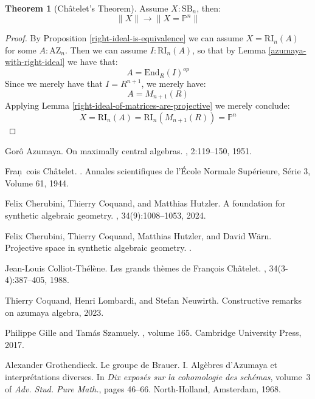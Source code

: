 \documentclass[10pt,a4paper]{article}
\theoremstyle{definition}
\newtheorem{theorem}{Theorem}[section]
\newcommand{\SB}{\mathrm{SB}}
\newcommand{\RI}{\mathrm{RI}}
\newcommand{\AZ}{\mathrm{AZ}}
\newcommand{\propTrunc}[1]{\lVert #1 \rVert}
\newcommand{\bP}{\mathbb{P}}
\begin{document}
\begin{theorem}[Ch\^atelet's Theorem]\label{chatelet-theorem}
Assume $X:\SB_n$, then:
\[\propTrunc{X}\to\propTrunc{X=\bP^n}\]
\end{theorem}

\begin{proof}
By Proposition \ref{right-ideal-is-equivalence} we can assume $X=\RI_n(A)$ for some $A:\AZ_n$. Then we can assume $I:\RI_n(A)$, so that by Lemma \ref{azumaya-with-right-ideal} we have that:
\[A=\mathrm{End}_R(I)^{op}\]
Since we merely have that $I=R^{n+1}$, we merely have:
\[A = M_{n+1}(R)\]
Applying Lemma \ref{right-ideal-of-matrices-are-projective} we merely conclude:
\[X=\RI_n(A)=\RI_n(M_{n+1}(R)) = \bP^n\]
\end{proof}

\begin{thebibliography}{10}

Gor\^o Azumaya.
\newblock On maximally central algebras.
, 2:119--150, 1951.

Fran\c~cois Ch\^atelet.
.
\newblock Annales scientifiques de l'\'Ecole Normale Sup\'erieure, S\'erie 3,
  Volume 61, 1944.

Felix {Cherubini}, Thierry {Coquand}, and Matthias {Hutzler}.
\newblock A foundation for synthetic algebraic geometry.
, 34(9):1008--1053,
  2024.

Felix Cherubini, Thierry Coquand, Matthias Hutzler, and David Wärn.
\newblock Projective space in synthetic algebraic geometry.
.

Jean-Louis Colliot-Th\'el\`ene.
\newblock Les grands th\`emes de {F}ran\c cois {C}h\^atelet.
, 34(3-4):387--405, 1988.

Thierry Coquand, Henri Lombardi, and Stefan Neuwirth.
\newblock Constructive remarks on azumaya algebra, 2023.

Philippe Gille and Tam{\'a}s Szamuely.
, volume 165.
\newblock Cambridge University Press, 2017.

Alexander Grothendieck.
\newblock Le groupe de {B}rauer. {I}. {A}lg\`ebres d'{A}zumaya et
  interpr\'etations diverses.
\newblock In {\em Dix expos\'es sur la cohomologie des sch\'emas}, volume~3 of
  {\em Adv. Stud. Pure Math.}, pages 46--66. North-Holland, Amsterdam, 1968.


\end{thebibliography}
\end{document}
